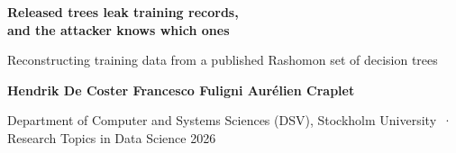 \documentclass{article}
\newcommand{\bodysize}{\fontsize{18}{23}\selectfont}
\newcommand{\rowgap}{\par\vspace{3mm}}
\begin{document}
\bodysize

\begin{tcolorbox}[enhanced,colback=accent,colframe=accent,arc=0mm,boxrule=0pt,
  left=10mm,right=10mm,top=5mm,bottom=4mm,width=\textwidth,before skip=0mm,after skip=0mm]
\color{white}
{\fontsize{48}{54}\selectfont\bfseries Released trees leak training records,\\
and the attacker knows which ones\par}
\vspace{2mm}
{\fontsize{22}{28}\selectfont Reconstructing training data from a published Rashomon set of decision trees\par}
\vspace{3mm}
{\fontsize{21}{26}\selectfont\bfseries Hendrik De Coster \quad Francesco Fuligni \quad Aurélien Craplet\par}
\vspace{1mm}
{\fontsize{18}{23}\selectfont Department of Computer and Systems Sciences (DSV), Stockholm University
\,·\, Research Topics in Data Science 2026\par}
\end{tcolorbox}
\rowgap
\end{document}
